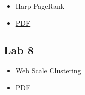 \begin{itemize}
\item
  Harp PageRank
\item
  \href{https://drive.google.com/open?id=0B88HKpainTSfaDNBTzdsTk1PQ1k}{PDF}
\end{itemize}

\subsection{Lab 8}\label{lab-8}

\begin{itemize}
\item
  Web Scale Clustering
\item
  \href{https://drive.google.com/open?id=0B88HKpainTSfaVN6SUxhOGFPQUk}{PDF}
\end{itemize}
